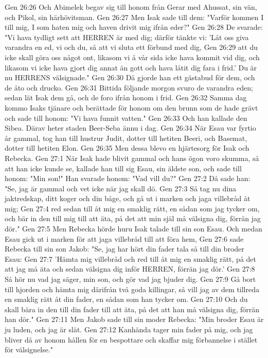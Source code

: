 Gen 26:26  Och Abimelek begav sig till honom från Gerar med Ahussat, sin vän, och Pikol, sin härhövitsman.
Gen 26:27  Men Isak sade till dem: "Varför kommen I till mig, I som haten mig och haven drivit mig ifrån eder?"
Gen 26:28  De svarade: "Vi hava tydligt sett att HERREN är med dig; därför tänkte vi: 'Låt oss giva varandra en ed, vi och du, så att vi sluta ett förbund med dig,
Gen 26:29  att du icke skall göra oss något ont, likasom vi å vår sida icke hava kommit vid dig, och likasom vi icke hava gjort dig annat än gott och hava låtit dig fara i frid.' Du är nu HERRENS välsignade."
Gen 26:30  Då gjorde han ett gästabud för dem, och de åto och drucko.
Gen 26:31  Bittida följande morgon svuro de varandra eden; sedan lät Isak dem gå, och de foro ifrån honom i frid.
Gen 26:32  Samma dag kommo Isaks tjänare och berättade för honom om den brunn som de hade grävt och sade till honom: "Vi hava funnit vatten."
Gen 26:33  Och han kallade den Sibea. Därav heter staden Beer-Seba ännu i dag.
Gen 26:34  När Esau var fyrtio år gammal, tog han till hustrur Judit, dotter till hetiten Beeri, och Basemat, dotter till hetiten Elon.
Gen 26:35  Men dessa blevo en hjärtesorg för Isak och Rebecka.
Gen 27:1  När Isak hade blivit gammal och hans ögon voro skumma, så att han icke kunde se, kallade han till sig Esau, sin äldste son, och sade till honom: "Min son!" Han svarade honom: "Vad vill du?"
Gen 27:2  Då sade han: "Se, jag är gammal och vet icke när jag skall dö.
Gen 27:3  Så tag nu dina jaktredskap, ditt koger och din båge, och gå ut i marken och jaga villebråd åt mig;
Gen 27:4  red sedan till åt mig en smaklig rätt, en sådan som jag tycker om, och bär in den till mig till att äta, på det att min själ må välsigna dig, förrän jag dör."
Gen 27:5  Men Rebecka hörde huru Isak talade till sin son Esau. Och medan Esau gick ut i marken för att jaga villebråd till att föra hem,
Gen 27:6  sade Rebecka till sin son Jakob: "Se, jag har hört din fader tala så till din broder Esau:
Gen 27:7  'Hämta mig villebråd och red till åt mig en smaklig rätt, på det att jag må äta och sedan välsigna dig inför HERREN, förrän jag dör.'
Gen 27:8  Så hör nu vad jag säger, min son, och gör vad jag bjuder dig.
Gen 27:9  Gå bort till hjorden och hämta mig därifrån två goda killingar, så vill jag av dem tillreda en smaklig rätt åt din fader, en sådan som han tycker om.
Gen 27:10  Och du skall bära in den till din fader till att äta, på det att han må välsigna dig, förrän han dör."
Gen 27:11  Men Jakob sade till sin moder Rebecka: "Min broder Esau är ju luden, och jag är slät.
Gen 27:12  Kanhända tager min fader på mig, och jag bliver då av honom hållen för en bespottare och skaffar mig förbannelse i stället för välsignelse."
